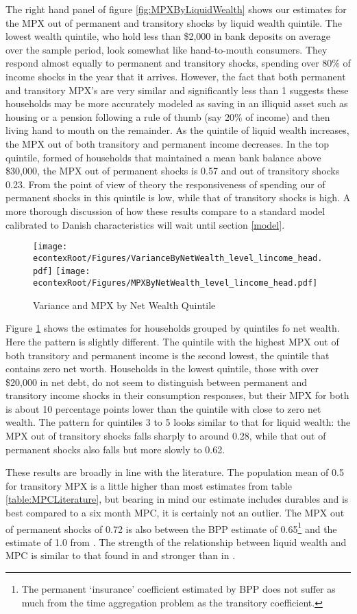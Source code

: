 \documentclass[titlepage]{\econtex}\newcommand{\texname}{ConsumptionHeterogeneity}
\begin{document}
The right hand panel of figure \ref{fig:MPXByLiquidWealth} shows our estimates for the MPX out of permanent and transitory shocks by liquid wealth quintile. The lowest wealth quintile, who hold less than \$2,000 in bank deposits on average over the sample period, look somewhat like hand-to-mouth consumers. They respond almost equally to permanent and transitory shocks, spending over 80\% of income shocks in the year that it arrives. However, the fact that both permanent and transitory MPX's are very similar and significantly less than 1 suggests these households may be more accurately modeled as saving in an illiquid asset such as housing or a pension following a rule of thumb (say 20\% of income) and then living hand to mouth on the remainder. As the quintile of liquid wealth increases, the MPX out of both transitory and permanent income decreases. In the top quintile, formed of households that maintained a mean bank balance above \$30,000, the MPX out of permanent shocks is 0.57 and out of transitory shocks 0.23. From the point of view of theory the responsiveness of spending our of permanent shocks in this quintile is low, while that of transitory shocks is high. A more thorough discussion of how these results compare to a standard model calibrated to Danish characteristics will wait until section \ref{model}.
\begin{figure}
	\centering
	\texttt{[image: \\econtexRoot/Figures/VarianceByNetWealth\_level\_lincome\_head.pdf]}
	\centering
	\texttt{[image: \\econtexRoot/Figures/MPXByNetWealth\_level\_lincome\_head.pdf]}
	\caption{Variance and MPX by Net Wealth Quintile}
	\label{fig:MPXByNetWealth}
\end{figure}

Figure \ref{fig:MPXByNetWealth} shows the estimates for households grouped by quintiles fo net wealth. Here the pattern is slightly different. The quintile with the highest MPX out of both transitory and permanent income is the second lowest, the quintile that contains zero net worth. Households in the lowest quintile, those with over \$20,000 in net debt, do not seem to distinguish between permanent and transitory income shocks in their consumption responses, but their MPX for both is about 10 percentage points lower than the quintile with close to zero net wealth. The pattern for quintiles 3 to 5 looks similar to that for liquid wealth: the MPX out of transitory shocks falls sharply to around 0.28, while that out of permanent shocks also falls but more slowly to 0.62.

These results are broadly in line with the literature. The population mean of 0.5 for transitory MPX is a little higher than most estimates from table \ref{table:MPCLiterature}, but bearing in mind our estimate includes durables and is best compared to a six month MPC, it is certainly not an outlier. The MPX out of permanent shocks of 0.72 is also between the BPP estimate of 0.65\footnote{The permanent `insurance' coefficient estimated by BPP does not suffer as much from the time aggregation problem as the transitory coefficient.} and the estimate of 1.0 from \cite{gelman_response_2016}. The strength of the relationship between liquid wealth and MPC is similar to that found in \cite{gelman_what_2016} and stronger than in \cite{fagereng_mpc_2016}.
\end{document}
